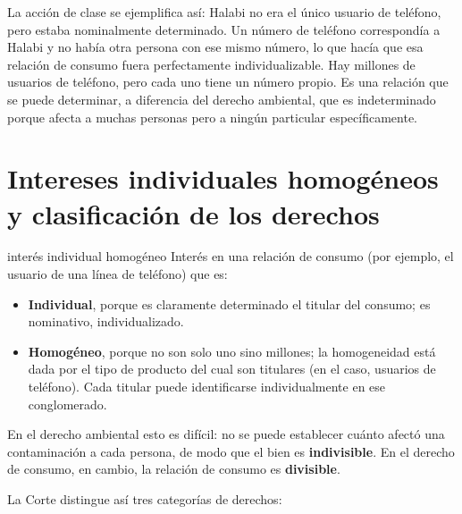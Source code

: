 \documentclass[12pt,oneside]{book}
\begin{document}
La acci\'on de clase se ejemplifica as\'i: Halabi no era el \'unico usuario de tel\'efono, pero estaba nominalmente determinado. Un n\'umero de tel\'efono correspond\'ia a Halabi y no hab\'ia otra persona con ese mismo n\'umero, lo que hac\'ia que esa relaci\'on de consumo fuera perfectamente individualizable. Hay millones de usuarios de tel\'efono, pero cada uno tiene un n\'umero propio. Es una relaci\'on que se puede determinar, a diferencia del derecho ambiental, que es indeterminado porque afecta a muchas personas pero a ning\'un particular espec\'ificamente.

\section{Intereses individuales homog\'eneos y clasificaci\'on de los derechos}

\begin{definition}{inter\'es individual homog\'eneo}
Inter\'es en una relaci\'on de consumo (por ejemplo, el usuario de una l\'inea de tel\'efono) que es:
\begin{itemize}[nosep]
\item \textbf{Individual}, porque es claramente determinado el titular del consumo; es nominativo, individualizado.
\item \textbf{Homog\'eneo}, porque no son solo uno sino millones; la homogeneidad est\'a dada por el tipo de producto del cual son titulares (en el caso, usuarios de tel\'efono). Cada titular puede identificarse individualmente en ese conglomerado.
\end{itemize}
\end{definition}

En el derecho ambiental esto es dif\'icil: no se puede establecer cu\'anto afect\'o una contaminaci\'on a cada persona, de modo que el bien es \textbf{indivisible}. En el derecho de consumo, en cambio, la relaci\'on de consumo es \textbf{divisible}.

La Corte distingue as\'i tres categor\'ias de derechos:
\end{document}
